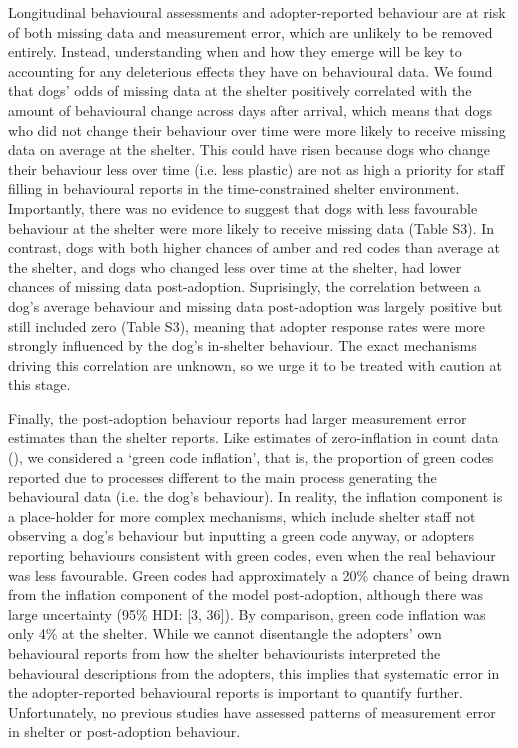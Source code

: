 \documentclass[12pt]{article}
\begin{document}
Longitudinal behavioural assessments and adopter-reported behaviour are at risk of both missing data and measurement error, which are unlikely to be removed entirely. Instead, understanding when and how they emerge will be key to accounting for any deleterious effects they have on behavioural data. We found that dogs' odds of missing data at the shelter positively correlated with the amount of behavioural change across days after arrival, which means that dogs who did not change their behaviour over time were more likely to receive missing data on average at the shelter. This could have risen because dogs who change their behaviour less over time (i.e. less plastic) are not as high a priority for staff filling in behavioural reports in the time-constrained shelter environment. Importantly, there was no evidence to suggest that dogs with less favourable behaviour at the shelter were more likely to receive missing data (Table S3). In contrast, dogs with both higher chances of amber and red codes than average at the shelter, and dogs who changed less over time at the shelter, had lower chances of missing data post-adoption. Suprisingly, the correlation between a dog's average behaviour and missing data post-adoption was largely positive but still included zero (Table S3), meaning that adopter response rates were more strongly influenced by the dog's in-shelter behaviour. The exact mechanisms driving this correlation are unknown, so we urge it to be treated with caution at this stage.

Finally, the post-adoption behaviour reports had larger measurement error estimates than the shelter reports. Like estimates of zero-inflation in count data (\cite{lambert1992}), we considered a `green code inflation', that is, the proportion of green codes reported due to processes different to the main process generating the behavioural data (i.e. the dog's behaviour). In reality, the inflation component is a place-holder for more complex mechanisms, which include shelter staff not observing a dog's behaviour but inputting a green code anyway, or adopters reporting behaviours consistent with green codes, even when the real behaviour was less favourable. Green codes had approximately a 20\% chance of being drawn from the inflation component of the model post-adoption, although there was large uncertainty (95\% HDI: [3, 36]). By comparison, green code inflation was only 4\% at the shelter. While we cannot disentangle the adopters' own behavioural reports from how the shelter behaviourists interpreted the behavioural descriptions from the adopters, this implies that systematic error in the adopter-reported behavioural reports is important to quantify further. Unfortunately, no previous studies have assessed patterns of measurement error in shelter or post-adoption behaviour.
\end{document}
